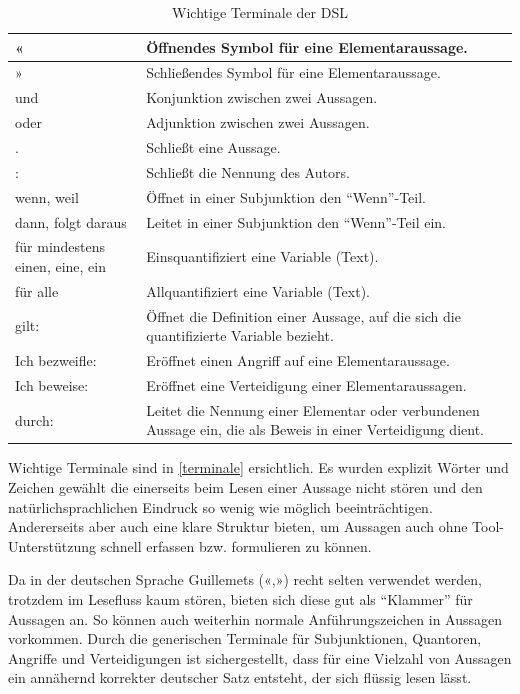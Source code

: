 \documentclass[11pt,a4paper,bibtotocnumbered]{scrreprt}
\begin{document}
\begin{table}[htbp]
\centering
\caption{Wichtige Terminale der DSL}
\label{terminale}
\begin{tabularx}{\textwidth}{|p{3cm}|X|}
\hline
« 				& Öffnendes Symbol für eine Elementaraussage.  \\ \hline
» 				& Schließendes Symbol für eine Elementaraussage.  \\ \hline
und  			& Konjunktion zwischen zwei Aussagen.   \\  \hline
oder  		& Adjunktion zwischen zwei Aussagen.   \\  \hline
.     			& Schließt eine Aussage.   \\  \hline
:				& Schließt die Nennung des Autors.   \\  \hline
wenn, weil	& Öffnet in einer Subjunktion den \enquote{Wenn}-Teil.   \\  \hline
dann, folgt daraus	& Leitet in einer Subjunktion den \enquote{Wenn}-Teil ein.   \\  \hline
für mindestens einen, eine, ein & Einsquantifiziert eine Variable (Text).   \\  \hline
für alle & Allquantifiziert eine Variable (Text).   \\  \hline
gilt:				& Öffnet die Definition einer Aussage, auf die sich die quantifizierte Variable bezieht.   \\  \hline
Ich bezweifle:		& Eröffnet einen Angriff auf eine Elementaraussage.   \\  \hline
Ich beweise:		& Eröffnet eine Verteidigung einer Elementaraussagen.   \\  \hline
durch:		& Leitet die Nennung einer Elementar oder verbundenen Aussage ein, die als Beweis in einer Verteidigung dient.   \\  \hline
\end{tabularx}
\end{table}

Wichtige Terminale sind in \autoref{terminale} ersichtlich.
Es wurden explizit Wörter und Zeichen gewählt die einerseits beim Lesen einer Aussage nicht stören und den natürlichsprachlichen Eindruck so wenig wie möglich beeinträchtigen. Andererseits aber auch eine klare Struktur bieten, um Aussagen auch ohne Tool-Unterstützung schnell erfassen bzw. formulieren zu können.

Da in der deutschen Sprache Guillemets («,») recht selten verwendet werden, trotzdem im Lesefluss kaum stören, bieten sich diese gut als \enquote{Klammer} für Aussagen an.
So können auch weiterhin normale Anführungszeichen in Aussagen vorkommen.
Durch die generischen Terminale für Subjunktionen, Quantoren, Angriffe und Verteidigungen ist sichergestellt, dass für eine Vielzahl von Aussagen ein annähernd korrekter deutscher Satz entsteht, der sich flüssig lesen lässt.
\end{document}

